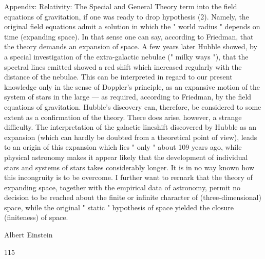 \documentclass{article}
\begin{document}
Appendix: Relativity: The Special and General Theory
term into the field equations of gravitation, if one was ready to drop hypothesis (2).
Namely, the original field equations admit a solution in which the " world radius " depends
on time (expanding space). In that sense one can say, according to Friedman, that the theory
demands an expansion of space.
A few years later Hubble showed, by a special investigation of the extra-galactic nebulae
(" milky ways "), that the spectral lines emitted showed a red shift which increased
regularly with the distance of the nebulae. This can be interpreted in regard to our present
knowledge only in the sense of Doppler's principle, as an expansive motion of the system of
stars in the large — as required, according to Friedman, by the field equations of
gravitation. Hubble's discovery can, therefore, be considered to some extent as a
confirmation of the theory.
There does arise, however, a strange difficulty. The interpretation of the galactic lineshift discovered by Hubble as an expansion (which can hardly be doubted from a theoretical
point of view), leads to an origin of this expansion which lies " only " about 109 years ago,
while physical astronomy makes it appear likely that the development of individual stars
and systems of stars takes considerably longer. It is in no way known how this incongruity
is to be overcome.
I further want to rernark that the theory of expanding space, together with the empirical
data of astronomy, permit no decision to be reached about the finite or infinite character of
(three-dimensional) space, while the original " static " hypothesis of space yielded the
closure (finiteness) of space.

Albert Einstein

115

\
\end{document}
